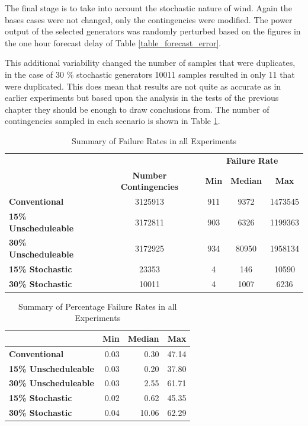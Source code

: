 \documentclass[a4paper,oneside,12pt]{report}
\begin{document}
The final stage is to take into account the stochastic nature of wind. Again the bases cases were not changed, only the contingencies were modified. The power output of the selected generators was randomly perturbed based on the figures in the one hour forecast delay of Table \ref{table_forecast_error}. 

This additional variability changed the number of samples that were duplicates, in the case of 30 \% stochastic generators 10011 samples resulted in only 11 that were duplicated. This does mean that results are not quite as accurate as in earlier experiments but based upon the analysis in the tests of the previous chapter they should be enough to draw conclusions from. The number of contingencies sampled in each scenario is shown in Table \ref{table_pacc_final}.

\begin{table}[htbp]
\centering
\caption{Summary of Failure Rates in all Experiments}
\begin{tabular}{l|c|c|c|c}
&                                & \multicolumn{3}{c}{ \bfseries Failure Rate} \\
& \bfseries Number Contingencies & \bfseries Min & \bfseries Median & \bfseries Max \\
\hline \hline
\bfseries Conventional        & 3125913 & 911 &  9372 & 1473545 \\
\bfseries 15\% Unscheduleable & 3172811 & 903 &  6326 & 1199363 \\
\bfseries 30\% Unscheduleable & 3172925 & 934 & 80950 & 1958134 \\
\bfseries 15\% Stochastic     &   23353 &   4 &   146 &   10590 \\
\bfseries 30\% Stochastic     &   10011 &   4 &  1007 &    6236  \\
\hline
\end{tabular}
\label{table_pacc_final}
\end{table}

\begin{table}[htbp]
\centering
\caption{Summary of Percentage Failure Rates in all Experiments}
\begin{tabular}{l|r|r|r}
\bfseries & \bfseries Min & \bfseries Median & \bfseries Max \\
\hline \hline
\bfseries Conventional        & 0.03 & 0.30 & 47.14 \\
\bfseries 15\% Unscheduleable & 0.03 & 0.20 & 37.80 \\
\bfseries 30\% Unscheduleable & 0.03 & 2.55 & 61.71 \\
\bfseries 15\% Stochastic     & 0.02 & 0.62 & 45.35 \\
\bfseries 30\% Stochastic     & 0.04 & 10.06 & 62.29 \\
\hline
\end{tabular}
\label{table_pacc_final_percent}
\end{table}
\end{document}
